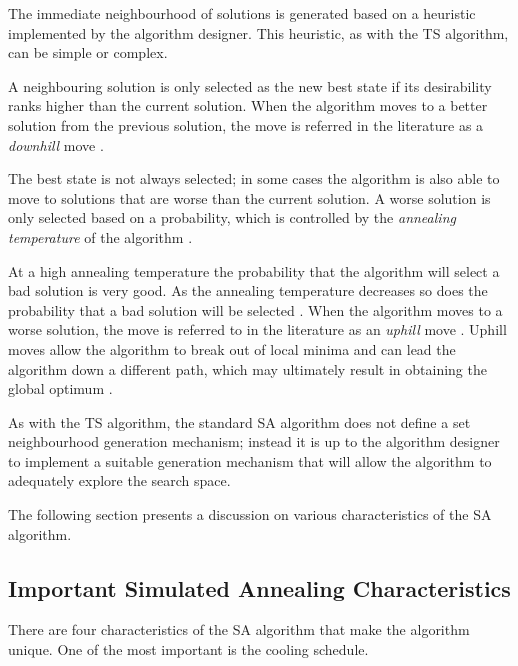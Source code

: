 The immediate neighbourhood of solutions is generated based on a heuristic implemented by the algorithm designer\cite{AIModernApproach}. This heuristic, as with the \gls{TS} algorithm, can be simple or complex.

A neighbouring solution is only selected as the new best state if its desirability ranks higher than the current solution. When the algorithm moves to a better solution from the previous solution, the move is referred in the literature as a \emph{downhill} move \cite{CurveFittingSA}.

The best state is not always selected; in some cases the algorithm is also able to move to solutions that are worse than the current solution. A worse solution is only selected based on a probability, which is controlled by the \emph{annealing temperature} of the algorithm \cite{TheoPraticalSA}. 

At a high annealing temperature the probability that the algorithm will select a bad solution is very good. As the annealing temperature decreases so does the probability that a bad solution will be selected \cite{CurveFittingSA}. When the algorithm moves to a worse solution, the move is referred to in the literature as an \emph{uphill} move \cite{CurveFittingSA}. Uphill moves allow the algorithm to break out of local minima and can lead the algorithm down a different path, which may ultimately result in obtaining the global optimum \cite{SASingleMultiObj}. 

As with the \gls{TS} algorithm, the standard \gls{SA} algorithm does not define a set neighbourhood generation mechanism; instead it is up to the algorithm designer to implement a suitable generation mechanism that will allow the algorithm to adequately explore the search space\cite{VariousCoolingSA}. 

The following section presents a discussion on various characteristics of the \gls{SA} algorithm.
\subsection{Important Simulated Annealing Characteristics}
There are four characteristics of the \gls{SA} algorithm that make the algorithm unique. One of the most important is the cooling schedule. 


